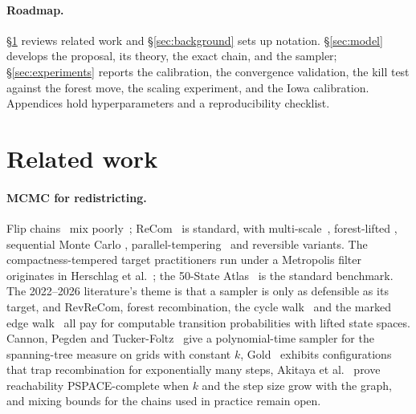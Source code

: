 \documentclass[11pt]{article}
\begin{document}
\paragraph{Roadmap.}\label{sec:intro-roadmap}
\S\ref{sec:related} reviews related work and \S\ref{sec:background}
sets up notation. \S\ref{sec:model} develops the proposal, its
theory, the exact chain, and the sampler; \S\ref{sec:experiments}
reports the calibration, the convergence validation, the kill test
against the forest move, the scaling experiment, and the Iowa
calibration. Appendices hold hyperparameters and a reproducibility
checklist.

\section{Related work}\label{sec:related}

\paragraph{MCMC for redistricting.} Flip chains~\cite{fifield2020automated}
mix poorly~\cite{najt2024empirical}; ReCom~\cite{deford2021recombination}
is standard, with multi-scale~\cite{autry2020multiscale}, forest-lifted
\cite{autry2023metropolized}, sequential Monte Carlo
\cite{mccartan2023sequential,osullivan2026generalized,cannon2024repetition},
parallel-tempering~\cite{chuang2025multiscale} and reversible
\cite{cannon2022spanning} variants. The compactness-tempered target
practitioners run under a Metropolis filter originates in Herschlag
et al.~\cite{herschlag2020quantifying}; the 50-State
Atlas~\cite{mccartan2022simulated} is the standard benchmark. The
2022--2026 literature's theme is that a sampler is only as defensible
as its target, and RevReCom, forest recombination, the cycle
walk~\cite{deford2025cycle} and the marked edge
walk~\cite{mcwhorter2025marked} all pay for computable transition
probabilities with lifted state spaces. Cannon, Pegden and
Tucker-Foltz~\cite{cannon2024sampling} give a polynomial-time sampler
for the spanning-tree measure on grids with constant $k$,
Gold~\cite{gold2026adversarial} exhibits configurations that trap
recombination for exponentially many steps, Akitaya et
al.~\cite{akitaya2022reconfiguration} prove reachability
PSPACE-complete when $k$ and the step size grow with the graph, and
mixing bounds for the chains used in practice remain open.
\end{document}
